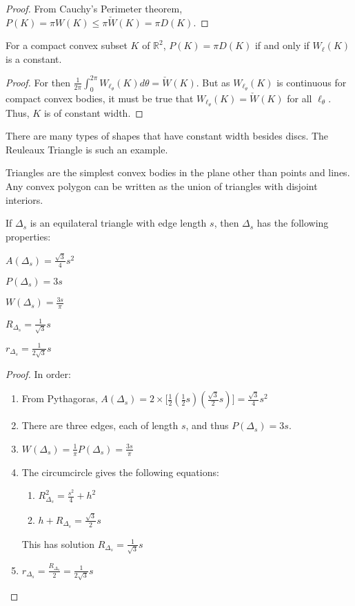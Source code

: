 \documentclass[crop=false,class=book]{standalone}
\begin{document}
\begin{proof}
From Cauchy's Perimeter theorem, $P(K) = \pi W(K) \leq \pi \check{W}(K) = \pi D(K)$.
\end{proof}
\begin{theorem}
For a compact convex subset $K$ of $\mathbb{R}^2$, $P(K) = \pi D(K)$ if and only if $W_{\ell}(K)$ is a constant.
\end{theorem}
\begin{proof}
For then $\frac{1}{2\pi} \int_{0}^{2\pi} W_{\ell_{\theta}}(K) d\theta = \check{W}(K)$. But as $W_{\ell_{\theta}}(K)$ is continuous for compact convex bodies, it must be true that $W_{\ell_{\theta}}(K) = \check{W}(K)$ for all $\ell_{\theta}$. Thus, $K$ is of constant width.
\end{proof}
\begin{remark}
There are many types of shapes that have constant width besides discs. The Reuleaux Triangle is such an example.
\end{remark}
Triangles are the simplest convex bodies in the plane other than points and lines. Any convex polygon can be written as the union of triangles with disjoint interiors. 
\begin{theorem}
If $\Delta_s$ is an equilateral triangle with edge length $s$, then $\Delta_s$ has the following properties:
\begin{enumerate}
\begin{multicols}{5}
\item $A(\Delta_s) = \frac{\sqrt{3}}{4}s^2$
\item $P(\Delta_s) = 3s$
\item $W(\Delta_s) = \frac{3s}{\pi}$
\item $R_{\Delta_s} = \frac{1}{\sqrt{3}}s$
\item $r_{\Delta_s} = \frac{1}{2\sqrt{3}}s$
\end{multicols}
\end{enumerate}
\end{theorem}
\begin{proof}
In order:
\begin{enumerate}
    \item From Pythagoras, $A(\Delta_s) =2\times\big[\frac{1}{2}(\frac{1}{2}s)(\frac{\sqrt{3}}{2}s)\big] = \frac{\sqrt{3}}{4}s^2$
    \item There are three edges, each of length $s$, and thus $P(\Delta_s) = 3s$.
    \item $W(\Delta_s) = \frac{1}{\pi}P(\Delta_s) = \frac{3s}{\pi}$
    \item The circumcircle gives the following equations:
    \begin{enumerate}
        \item $R_{\Delta_s}^2=\frac{s^2}{4}+h^2$
        \item $h+R_{\Delta_s} = \frac{\sqrt{3}}{2}s$
    \end{enumerate}
    This has solution $R_{\Delta_s}=\frac{1}{\sqrt{3}}s$
    \item $r_{\Delta_s} = \frac{R_{\Delta_s}}{2}= \frac{1}{2\sqrt{3}}s$
\end{enumerate}
\end{proof}
\end{document}
